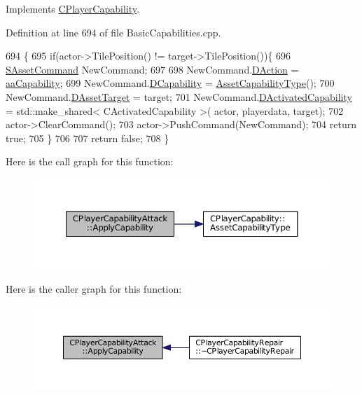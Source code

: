 Implements \hyperlink{classCPlayerCapability_a2ca6fd7fbd9c0178f1cf1d049c63825f}{C\+Player\+Capability}.



Definition at line 694 of file Basic\+Capabilities.\+cpp.


\begin{DoxyCode}
694                                                                                                            
                                                          \{
695     \textcolor{keywordflow}{if}(actor->TilePosition() != target->TilePosition())\{
696         \hyperlink{structSAssetCommand}{SAssetCommand} NewCommand;
697         
698         NewCommand.\hyperlink{structSAssetCommand_a8edd3b3d59a76d5514ba403bc8076a75}{DAction} = \hyperlink{GameDataTypes_8h_ab47668e651a3032cfb9c40ea2d60d670acf9fb164e8abd71c71f4a8c7fda360d4}{aaCapability};
699         NewCommand.\hyperlink{structSAssetCommand_a734ea7c6847457b437360f333f570ff9}{DCapability} = \hyperlink{classCPlayerCapability_a433bb196cd6ab6a932f1cac102b3aa98}{AssetCapabilityType}();
700         NewCommand.\hyperlink{structSAssetCommand_a3d9b43f6e59c386c48c41a65448a0c39}{DAssetTarget} = target;
701         NewCommand.\hyperlink{structSAssetCommand_ad8beda19520811cc70fe1eab16c774dd}{DActivatedCapability} = std::make\_shared< CActivatedCapability >(
      actor, playerdata, target);
702         actor->ClearCommand();
703         actor->PushCommand(NewCommand);
704         \textcolor{keywordflow}{return} \textcolor{keyword}{true};
705     \}
706 
707     \textcolor{keywordflow}{return} \textcolor{keyword}{false};
708 \}
\end{DoxyCode}
Here is the call graph for this function\+:\nopagebreak
\begin{figure}[H]
\begin{center}
\leavevmode
\includegraphics[width=350pt]{classCPlayerCapabilityAttack_a536095f572f9f6af786eaec0376f3771_cgraph}
\end{center}
\end{figure}
Here is the caller graph for this function\+:\nopagebreak
\begin{figure}[H]
\begin{center}
\leavevmode
\includegraphics[width=350pt]{classCPlayerCapabilityAttack_a536095f572f9f6af786eaec0376f3771_icgraph}
\end{center}
\end{figure}

